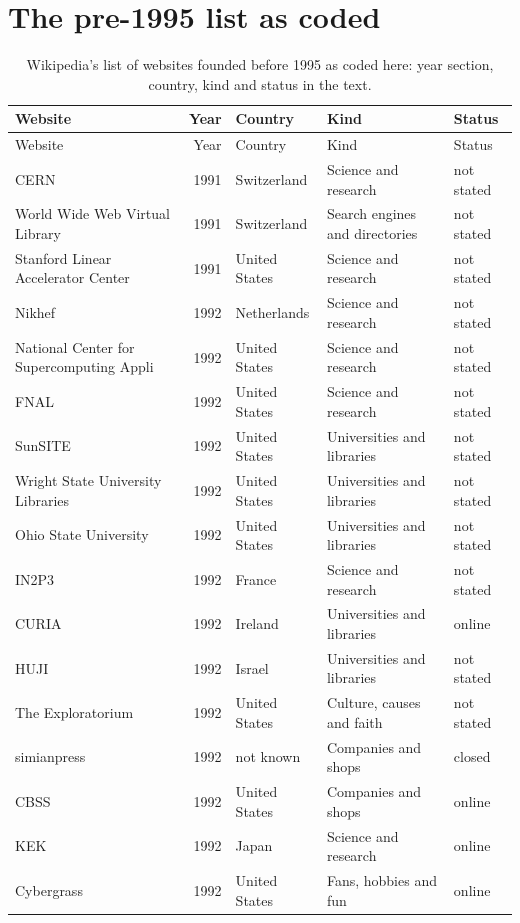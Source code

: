 \documentclass[11pt,a4paper]{article}
\begin{document}
\section{The pre-1995 list as coded}
\begin{footnotesize}\begin{longtable}{p{4.6cm}rp{2.8cm}p{4.3cm}l}\caption{Wikipedia's list of websites founded before 1995 as coded here: year section, country, kind and status in the text.}\label{tab:list}\\\toprule Website & Year & Country & Kind & Status\\\midrule\endfirsthead\toprule Website & Year & Country & Kind & Status\\\midrule\endhead
CERN & 1991 & Switzerland & Science and research & not stated\\
World Wide Web Virtual Library & 1991 & Switzerland & Search engines and directories & not stated\\
Stanford Linear Accelerator Center & 1991 & United States & Science and research & not stated\\
Nikhef & 1992 & Netherlands & Science and research & not stated\\
National Center for Supercomputing Appli & 1992 & United States & Science and research & not stated\\
FNAL & 1992 & United States & Science and research & not stated\\
SunSITE & 1992 & United States & Universities and libraries & not stated\\
Wright State University Libraries & 1992 & United States & Universities and libraries & not stated\\
Ohio State University & 1992 & United States & Universities and libraries & not stated\\
IN2P3 & 1992 & France & Science and research & not stated\\
CURIA & 1992 & Ireland & Universities and libraries & online\\
HUJI & 1992 & Israel & Universities and libraries & not stated\\
The Exploratorium & 1992 & United States & Culture, causes and faith & not stated\\
simianpress & 1992 & not known & Companies and shops & closed\\
CBSS & 1992 & United States & Companies and shops & online\\
KEK & 1992 & Japan & Science and research & online\\
Cybergrass & 1992 & United States & Fans, hobbies and fun & online\\

\end{longtable}
\end{footnotesize}
\end{document}
